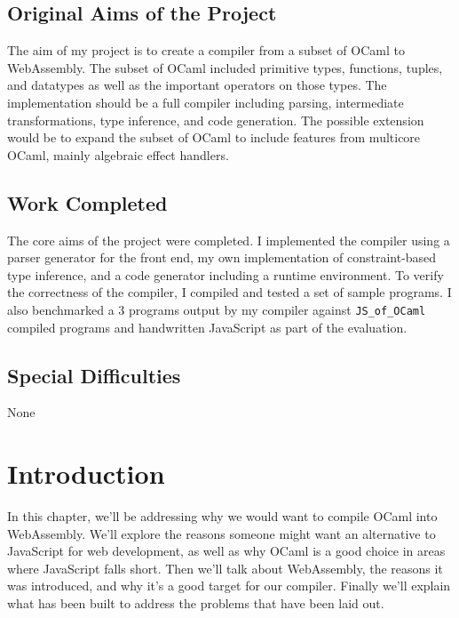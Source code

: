 \documentclass[12pt,a4paper,twoside,openright]{report}
\newcommand{\JSofOCaml}{{\tt JS\_of\_OCaml} }
\begin{document}
\section*{Original Aims of the Project}
The aim of my project is to create a compiler from a subset of OCaml to WebAssembly.
The subset of OCaml included primitive types, functions, tuples, and datatypes as well as the important operators on those types.
The implementation should be a full compiler including parsing, intermediate transformations, type inference, and code generation.
The possible extension would be to expand the subset of OCaml to include features from multicore OCaml, mainly algebraic effect handlers.
\vspace{-1.5em}

\section*{Work Completed}
The core aims of the project were completed.
I implemented the compiler using a parser generator for the front end, my own implementation of constraint-based type inference, and a code generator including a runtime environment.
To verify the correctness of the compiler, I compiled and tested a set of sample programs.
I also benchmarked a 3 programs output by my compiler against \JSofOCaml compiled programs and handwritten JavaScript as part of the evaluation.
\vspace{-1.5em}

\section*{Special Difficulties}
None

\tableofcontents

\listoffigures


\pagestyle{headings}

\chapter{Introduction}
In this chapter, we'll be addressing why we would want to compile OCaml into WebAssembly.
We'll explore the reasons someone might want an alternative to JavaScript for web development, as well as why OCaml is a good choice in areas where JavaScript falls short.
Then we'll talk about WebAssembly, the reasons it was introduced, and why it's a good target for our compiler.
Finally we'll explain what has been built to address the problems that have been laid out.
\end{document}
